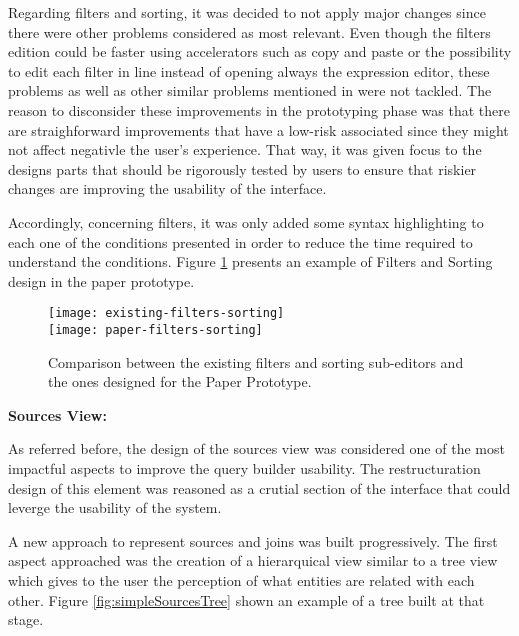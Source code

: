 Regarding filters and sorting, it was decided to not apply major changes since there were other problems considered as most relevant. Even though the filters edition could be faster using accelerators such as copy and paste or the possibility to edit each filter in line instead of opening always the expression editor, these problems as well as other similar problems mentioned in  were not tackled. The reason to disconsider these improvements in the prototyping phase was that there are straighforward improvements that have a low-risk associated since they might not affect negativle the user's experience. That way, it was given focus to the designs parts that should be rigorously tested by users to ensure that riskier changes are improving the usability of the interface.

Accordingly, concerning filters, it was only added some syntax highlighting to each one of the conditions presented in order to reduce the time required to understand the conditions. Figure \ref{fig:filtersAndSortingComparison} presents an example of Filters and Sorting design in the paper prototype.

\begin{figure}[tb]
  \centering
    {\texttt{[image: existing-filters-sorting]}}%
    \\
  {\texttt{[image: paper-filters-sorting]}}%
\caption{Comparison between the existing filters and sorting sub-editors and the ones designed for the Paper Prototype.}
  \label{fig:filtersAndSortingComparison}
\end{figure}

\medskip

\textbf{Sources View: }

\medskip

As referred before, the design of the sources view was considered one of the most impactful aspects to improve the query builder usability. The restructuration design of this element was reasoned as a crutial section of the interface that could leverge the usability of the system. 

A new approach to represent sources and joins was built progressively. The first aspect approached was the creation of a hierarquical view similar to a tree view which gives to the user the perception of what entities are related with each other. Figure \ref{fig:simpleSourcesTree} shown an example of a tree built at that stage.

